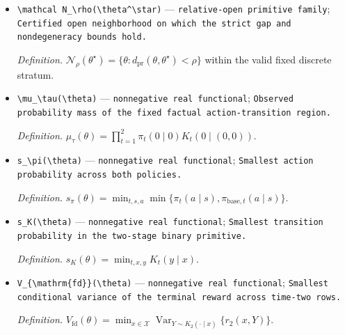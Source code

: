 \documentclass{article}
\begin{document}
\begin{itemize}
  \par\smallskip\noindent\emph{Definition.} \(d_{\mathrm{pr}}\) is the maximum rowwise \(\ell^1\) discrepancy for transition and policy kernels and the sup discrepancy for reward cells, as specified in \(\texttt{def:quantitative-gap-neighborhood}\).
  \item \texttt{\textbackslash{}\allowbreak{}mathcal N\_\allowbreak{}\textbackslash{}\allowbreak{}rho(\textbackslash{}\allowbreak{}theta\textasciicircum{}\textbackslash{}\allowbreak{}star)} --- \texttt{relative-\allowbreak{}open primitive family}; \texttt{Certified open neighborhood on which the strict gap and nondegeneracy bounds hold.}
  \par\smallskip\noindent\emph{Definition.} \(\mathcal N_\rho(\theta^\star)=\{\theta:d_{\mathrm{pr}}(\theta,\theta^\star)<\rho\}\) within the valid fixed discrete stratum.
  \item \texttt{\textbackslash{}\allowbreak{}mu\_\allowbreak{}\textbackslash{}\allowbreak{}tau(\textbackslash{}\allowbreak{}theta)} --- \texttt{nonnegative real functional}; \texttt{Observed probability mass of the fixed factual action-\allowbreak{}transition region.}
  \par\smallskip\noindent\emph{Definition.} \(\mu_\tau(\theta)=\prod_{t=1}^2\pi_t(0\mid0)K_t(0\mid(0,0))\).
  \item \texttt{s\_\allowbreak{}\textbackslash{}\allowbreak{}pi(\textbackslash{}\allowbreak{}theta)} --- \texttt{nonnegative real functional}; \texttt{Smallest action probability across both policies.}
  \par\smallskip\noindent\emph{Definition.} \(s_\pi(\theta)=\min_{t,s,a}\min\{\pi_t(a\mid s),\pi_{\mathrm{base},t}(a\mid s)\}\).
  \item \texttt{s\_\allowbreak{}K(\textbackslash{}\allowbreak{}theta)} --- \texttt{nonnegative real functional}; \texttt{Smallest transition probability in the two-\allowbreak{}stage binary primitive.}
  \par\smallskip\noindent\emph{Definition.} \(s_K(\theta)=\min_{t,x,y}K_t(y\mid x)\).
  \item \texttt{V\_\allowbreak{}\{\textbackslash{}\allowbreak{}mathrm\{fd\}\allowbreak{}\}\allowbreak{}(\textbackslash{}\allowbreak{}theta)} --- \texttt{nonnegative real functional}; \texttt{Smallest conditional variance of the terminal reward across time-\allowbreak{}two rows.}
  \par\smallskip\noindent\emph{Definition.} \(V_{\mathrm{fd}}(\theta)=\min_{x\in\mathcal X}\operatorname{Var}_{Y\sim K_2(\cdot\mid x)}\{r_2(x,Y)\}\).

\end{itemize}
\end{document}

